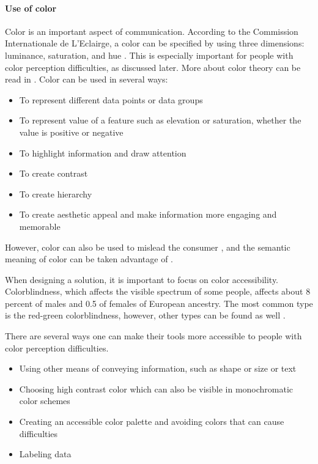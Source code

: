 \paragraph{Use of color}
\label{sec:color}
Color is an important aspect of communication. According to the Commission Internationale de L'Eclairge, a color can be specified by using three dimensions: luminance, saturation, and hue \citep{wyszecki2000color}. This is especially important for people with color perception difficulties, as discussed later. More about color theory can be read in \cite{healey1996choosing}.
Color can be used in several ways:
\begin{itemize}
    \item To represent different data points or data groups
    \item To represent value of a feature such as elevation or saturation, whether the value is positive or negative
    \item To highlight information and draw attention
    \item To create contrast
    \item To create hierarchy
    \item To create aesthetic appeal and make information more engaging and memorable
\end{itemize}

However, color can also be used to mislead the consumer \citep{szafir2018good}, and the semantic meaning of color can be taken advantage of \citep{lin2013selecting}.

When designing a solution, it is important to focus on color accessibility. Colorblindness, which affects the visible spectrum of some people, affects about 8 percent of males and 0.5 of females of European ancestry. The most common type is the red-green colorblindness, however, other types can be found as well \citep{wong2011color}.

There are several ways one can make their tools more accessible to people with color perception difficulties.

\begin{itemize}
    \item Using other means of conveying information, such as shape or size or text
    \item Choosing high contrast color which can also be visible in monochromatic color schemes
    \item Creating an accessible color palette and avoiding colors that can cause difficulties
    \item Labeling data
\end{itemize}


